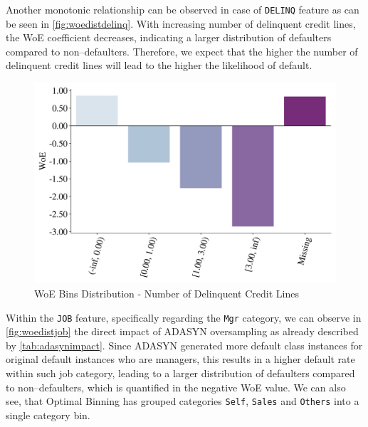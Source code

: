 Another monotonic relationship can be observed in case of \texttt{DELINQ} feature as can be seen in \autoref{fig:woedistdelinq}. With increasing number of delinquent credit lines, the WoE coefficient decreases, indicating a larger distribution of defaulters compared to non--defaulters. Therefore, we expect that the higher the number of delinquent credit lines will lead to the higher the likelihood of default.


\begin{figure}[H]
    \centering
    \caption{WoE Bins Distribution - Number of Delinquent Credit Lines}\vspace{0.5em}
    \label{fig:woedistdelinq}
    \includegraphics[width=120mm]{Figures/WoE_Distribution_DELINQ.jpg}
    
    \vspace{-1em}
\end{figure}

Within the \texttt{JOB} feature, specifically regarding the \texttt{Mgr} category, we can observe in \autoref{fig:woedistjob} the direct impact of ADASYN oversampling as already described by \autoref{tab:adasynimpact}.
Since ADASYN generated more default class instances for original default instances who are managers, this results in a higher default rate within such job category, leading to a larger distribution of defaulters compared to non--defaulters, which is quantified in the negative WoE value.
We can also see, that Optimal Binning has grouped categories \texttt{Self}, \texttt{Sales} and \texttt{Others} into a single category bin.



